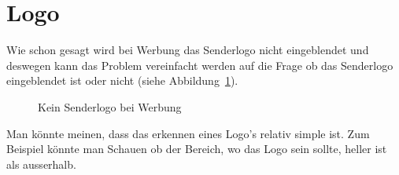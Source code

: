 \documentclass[12pt,a4paper]{report}
\begin{document}
\section{Logo}
Wie schon gesagt wird bei Werbung das Senderlogo nicht eingeblendet und deswegen kann das Problem
vereinfacht werden auf die Frage ob das Senderlogo eingeblendet ist oder nicht (siehe Abbildung~\ref{fig:logo1}).
\begin{figure}[h]%
    \centering
    \qquad
    \caption{Kein Senderlogo bei Werbung}%
    \label{fig:logo1}%
\end{figure}
Man könnte meinen, dass das erkennen eines Logo's relativ simple ist.
Zum Beispiel könnte man Schauen ob der Bereich, wo das Logo sein sollte, heller ist als ausserhalb.
\end{document}

